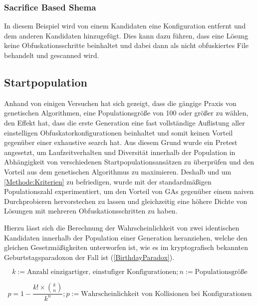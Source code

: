\subsubsection{Sacrifice Based Shema}
In diesem Beispiel wird von einem Kandidaten eine Konfiguration entfernt und dem anderen Kandidaten hinzugefügt. Dies kann dazu führen, dass eine Lösung keine Obfuskationsschritte beinhaltet und dabei dann als nicht obfuskiertes File behandelt und gescanned wird.




\subsection{Startpopulation} \label{GA:inital_population}
Anhand von einigen Versuchen hat sich gezeigt, dass die gängige Praxis von genetischen Algorithmen, eine Populationsgröße von 100 oder größer zu wählen, den Effekt hat, dass die erste Generation eine fast vollständige Auflistung aller einstelligen Obfuskatorkonfigurationen beinhaltet und somit keinen Vorteil gegenüber einer exhaustive search hat. Aus diesem Grund wurde ein Pretest angesetzt, um Laufzeitverhalten und Diversität innerhalb der Population in Abhängigkeit von verschiedenen Startpopulationsansätzen zu überprüfen und den Vorteil aus dem genetischen Algorithmus zu maximieren.
Deshalb und um \ref{Methode:Kriterien} zu befriedigen, wurde mit der standardmäßigen Populationszahl experimentiert, um den Vorteil von GAs gegenüber einem naiven Durchprobieren hervorstechen zu lassen und gleichzeitig eine höhere Dichte von Lösungen mit mehreren Obfuskationsschritten zu haben.

Hierzu lässt sich die Berechnung der Wahrscheinlichkeit von zwei identischen Kandidaten innerhalb der Population einer Generation heranziehen, welche den gleichen Gesetzmäßigkeiten unterworfen ist, wie es im kryptografisch bekannten Geburtstagsparadoxon der Fall ist (\ref{BirthdayParadox}).
\begin{float}
    
\begin{equation}
    k := \text{Anzahl einzigartiger, einstufiger Konfigurationen}; 
    n := \text{Populationsgröße}
\end{equation}


\begin{equation}
    \label{BirthdayParadox} 
    p = 1 - \frac{k! \times \binom{k}{n}}{k^{n}}; p := \text{Wahrscheinlichkeit von Kollisionen bei Konfigurationen}
\end{equation}
\end{float}


